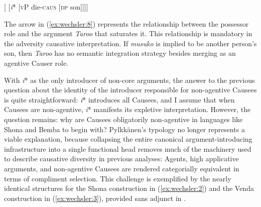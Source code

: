\documentclass[output=paper,modfonts,nonflat,colorlinks,citecolor=brown]{langsci/langscibook}
\begin{document}
\newpage 

\ea\label{ex:wechsler:8}
{[ [\textit{i}* [\textsc{vP} die-\textsc{caus} [\textsc{dp} \textsc{} son]]]]} \\
                
\z
{}

 

The arrow in (\ref{ex:wechsler:8}) represents the relationship between the possessor role and the argument \textit{Taroo} that saturates it. This relationship is mandatory in the adversity causative interpretation. If \textit{musuko} is implied to be another person’s son, then \textit{Taroo} has no semantic integration strategy besides merging as an agentive Causer role. 

With \textit{i}* as the only introducer of non-core arguments, the answer to the previous question about the identity of the introducer responsible for non-agentive Causees is quite straightforward: \textit{i}* introduces all Causees, and I assume that when Causees are non-agentive, \textit{i}* manifests its expletive interpretation. However, the question remains: why are Causees obligatorily non-agentive in languages like Shona and Bemba to begin with? Pylkkänen’s typology no longer represents a viable explanation, because collapsing the entire canonical argument-introducing infrastructure into a single functional head removes much of the machinery used to describe causative diversity in previous analyses: Agents, high applicative arguments, and non-agentive Causees are rendered categorially equivalent in terms of compliment selection. This challenge is exemplified by the nearly identical structures for the Shona construction in (\ref{ex:wechsler:2}) and the Venda construction in (\ref{ex:wechsler:3}), provided sans adjunct in .
  
\end{document}
